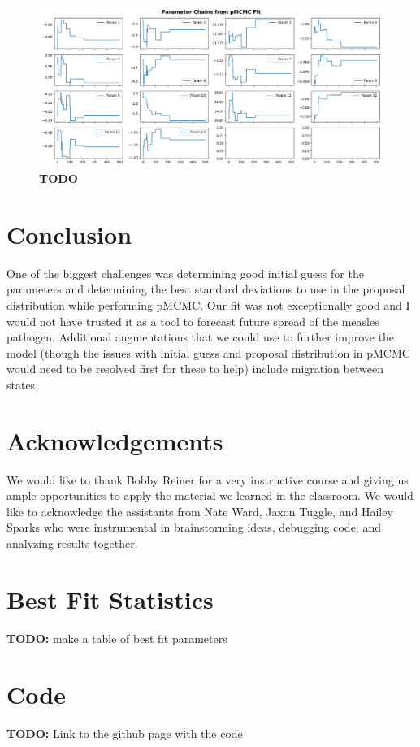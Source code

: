 \documentclass[11pt]{amsart}
\begin{document}
\begin{figure}[h]
	\centering
	\includegraphics[width=1\textwidth]{../visuals/pmcmc_parameter_chains.png}
 	\caption{\textbf{TODO}}\label{fig:f3}
\end{figure}

\section{Conclusion}\label{sec:conclustion}
One of the biggest challenges was determining good initial guess for the parameters and determining the best standard deviations to use in the proposal distribution while performing pMCMC.
Our fit was not exceptionally good and I would not have trusted it as a tool to forecast future spread of the measles pathogen.
Additional augmentations that we could use to further improve the model (though the issues with initial guess and proposal distribution in pMCMC would need to be resolved first for these to help) include migration between states, 

\section*{Acknowledgements}
We would like to thank Bobby Reiner for a very instructive course and giving us ample opportunities to apply the material we learned in the classroom.
We would like to acknowledge the assistants from Nate Ward, Jaxon Tuggle, and Hailey Sparks who were instrumental in brainstorming ideas, debugging code, and analyzing results together.

\newpage
\appendix

\section{Best Fit Statistics}
\textbf{TODO:} make a table of best fit parameters

\section{Code}
\textbf{TODO:} Link to the github page with the code



\end{document}
